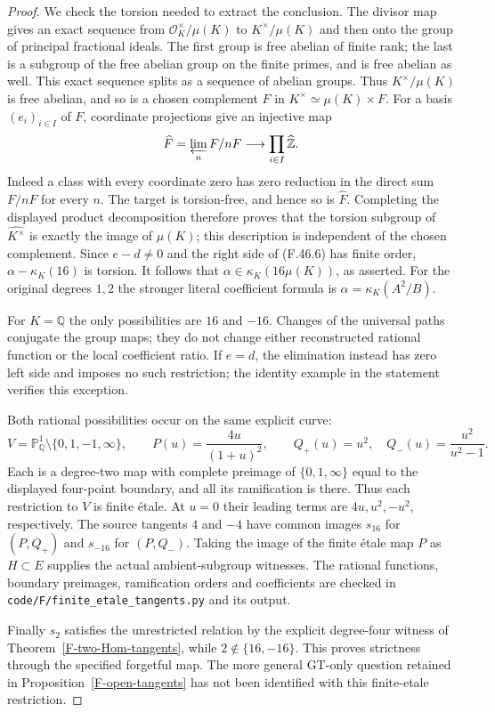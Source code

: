 \begin{proof}
We check the torsion needed to extract the conclusion.
The divisor map gives an exact sequence from
$\mathcal O_K^\times/\mu(K)$ to $K^\times/\mu(K)$ and then
onto the group of principal fractional ideals. The first
group is free abelian of finite rank; the last is a subgroup
of the free abelian group on the finite primes, and is free
abelian as well. This exact sequence splits as a sequence of
abelian groups. Thus $K^\times/\mu(K)$ is free abelian, and
so is a chosen complement $F$ in
$K^\times\simeq\mu(K)\times F$. For a basis $(e_i)_{i\in I}$
of $F$, coordinate projections give an injective map
\[
       \widehat F=\varprojlim_n F/nF
              \longrightarrow\prod_{i\in I}\widehat{\mathbb Z}.
\]
Indeed a class with every coordinate zero has zero reduction
in the direct sum $F/nF$ for every $n$. The target is
torsion-free, and hence so is $\widehat F$. Completing the
displayed product decomposition therefore proves that the
torsion subgroup of $\widehat{K^\times}$ is exactly the image
of $\mu(K)$; this description is independent of the chosen
complement. Since $e-d\ne0$ and the right side of (F.46.6)
has finite order, $\alpha-\kappa_K(16)$ is torsion. It follows
that $\alpha\in\kappa_K(16\mu(K))$, as asserted. For the
original degrees $1,2$ the stronger literal coefficient
formula is $\alpha=\kappa_K(A^2/B)$.

For $K=\mathbb Q$ the only possibilities are $16$ and $-16$.
Changes of the universal paths conjugate the group maps; they
do not change either reconstructed rational function or the
local coefficient ratio. If $e=d$, the elimination instead
has zero left side and imposes no such restriction; the
identity example in the statement verifies this exception.

Both rational possibilities occur on the same explicit curve:
\[
 V=\mathbb P^1_{\mathbb Q}\setminus\{0,1,-1,\infty\},
 \qquad P(u)=\frac{4u}{(1+u)^2},\qquad
 Q_+(u)=u^2,\quad Q_-(u)=\frac{u^2}{u^2-1}.
 \tag{F.46.7}
\]
Each is a degree-two map with complete preimage of
$\{0,1,\infty\}$ equal to the displayed four-point boundary,
and all its ramification is there. Thus each restriction to
$V$ is finite \'etale. At $u=0$ their leading terms are
$4u,u^2,-u^2$, respectively. The source tangents $4$ and $-4$
have common images $s_{16}$ for $(P,Q_+)$ and $s_{-16}$ for
$(P,Q_-)$. Taking the image of the finite \'etale map $P$
as $H\subset E$ supplies the actual ambient-subgroup witnesses.
The rational functions, boundary preimages, ramification orders
and coefficients are checked in
\texttt{code/F/finite\_etale\_tangents.py} and its output.

Finally $s_2$ satisfies the unrestricted relation by the explicit
degree-four witness of Theorem~\ref{F-two-Hom-tangents}, while
$2\notin\{16,-16\}$. This proves strictness through the
specified forgetful map. The more general GT-only question
retained in Proposition~\ref{F-open-tangents} has not been
identified with this finite-etale restriction.
\end{proof}

